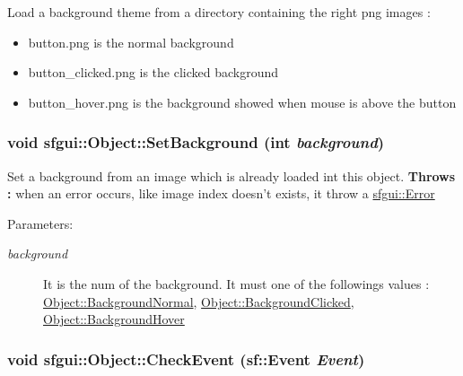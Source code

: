 Load a background theme from a directory containing the right png images : \begin{itemize}
\item button.png is the normal background \item button\_\-clicked.png is the clicked background \item button\_\-hover.png is the background showed when mouse is above the button \end{itemize}
\hypertarget{classsfgui_1_1Object_b3477443fde0d86be5e32f5c1dcd7b01}{
\subsubsection[SetBackground]{\setlength{\rightskip}{0pt plus 5cm}void sfgui::Object::SetBackground (int {\em background})}}
\label{classsfgui_1_1Object_b3477443fde0d86be5e32f5c1dcd7b01}




Set a background from an image which is already loaded int this object. {\bf Throws : }when an error occurs, like image index doesn't exists, it throw a \hyperlink{classsfgui_1_1Error}{sfgui::Error} \begin{Desc}
\item[Parameters:]
\begin{description}
\item[{\em background}]It is the num of the background. It must one of the followings values : \hyperlink{classsfgui_1_1Object_8a7d7ae20a88b7ef8a104f7e6c8596cee8211d79a1f35d08db2b31a914bddc38}{Object::BackgroundNormal}, \hyperlink{classsfgui_1_1Object_8a7d7ae20a88b7ef8a104f7e6c8596ce03b529b6f0fee7ab7cc0033441180b67}{Object::BackgroundClicked}, \hyperlink{classsfgui_1_1Object_8a7d7ae20a88b7ef8a104f7e6c8596ce9befc9dbae9107e3e7546af33a139df9}{Object::BackgroundHover} \end{description}
\end{Desc}
\hypertarget{classsfgui_1_1Object_cd9dbf2abe79e04c22f281bccb8bdb0e}{
\subsubsection[CheckEvent]{\setlength{\rightskip}{0pt plus 5cm}void sfgui::Object::CheckEvent (sf::Event {\em Event})}}
\label{classsfgui_1_1Object_cd9dbf2abe79e04c22f281bccb8bdb0e}


